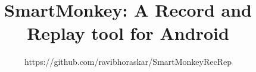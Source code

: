 \documentclass[10pt]{report}
\begin{document}
\title{SmartMonkey: A Record and Replay tool for Android
}
\author{https://github.com/ravibhoraskar/SmartMonkeyRecRep} 


\maketitle
\tableofcontents
\newpage










\end{document}
